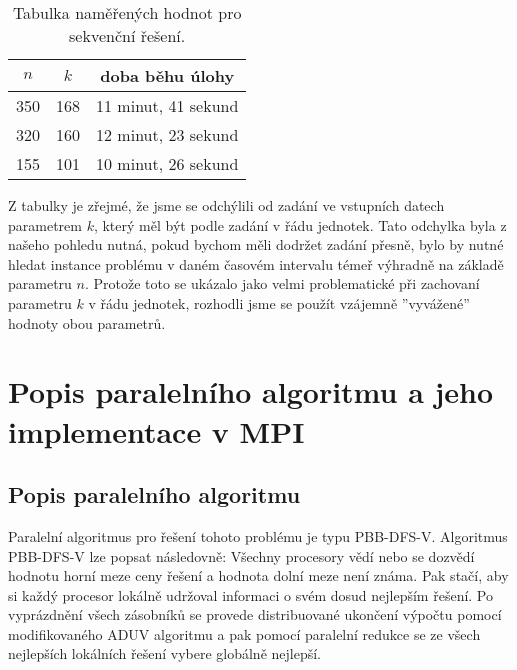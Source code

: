\documentclass[12pt]{article}
\begin{document}
\begin{table}[ht]
  \begin{center}
    \begin{tabular}{| c | c | c |}
      \hline
      $n$ & $k$ & doba běhu úlohy \\ \hline
      350 & 168 & 11 minut, 41 sekund \\ \hline
      320 & 160 & 12 minut, 23 sekund \\ \hline
      155 & 101 & 10 minut, 26 sekund \\
      \hline
    \end{tabular}
    \caption{Tabulka naměřených hodnot pro sekvenční řešení.}
  \end{center}
\end{table}

Z tabulky je zřejmé, že jsme se odchýlili od zadání ve vstupních datech parametrem $k$, který měl být podle zadání v řádu jednotek.
Tato odchylka byla z našeho pohledu nutná, pokud bychom měli dodržet zadání přesně, bylo by nutné hledat instance problému
v daném časovém intervalu témeř výhradně na základě parametru $n$. Protože toto se ukázalo jako velmi problematické při zachovaní 
parametru $k$ v řádu jednotek, rozhodli jsme se použít vzájemně ''vyvážené'' hodnoty obou parametrů.



\section{Popis paralelního algoritmu a jeho implementace v MPI}

\subsection{Popis paralelního algoritmu}

Paralelní algoritmus pro řešení tohoto problému je typu PBB-DFS-V. 
Algoritmus PBB-DFS-V lze popsat následovně: 
Všechny procesory vědí nebo se dozvědí hodnotu horní meze ceny řešení a hodnota dolní meze není známa. 
Pak stačí, aby si každý procesor lokálně udržoval informaci o svém dosud nejlepším řešení. 
Po vyprázdnění všech zásobníků se provede distribuované ukončení výpočtu pomocí modifikovaného ADUV algoritmu a 
pak pomocí paralelní redukce se ze všech nejlepších lokálních řešení vybere globálně nejlepší. 
\end{document}
